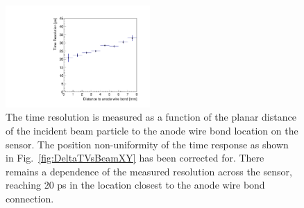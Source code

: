 \begin{figure}[htbp]
\centering 
\includegraphics[width=0.49\textwidth]{figures/TimeResolutionVsR.pdf} 
\caption{ The time resolution is measured as a function of the planar distance of the 
incident beam particle to the anode wire bond location on the sensor. The position non-uniformity
of the time response as shown in Fig.~\ref{fig:DeltaTVsBeamXY} has been corrected for. There 
remains a dependence of the measured resolution across the sensor, reaching 20 ps in the location
closest to the anode wire bond connection.}
\label{fig:TimeResolutionVsR}
\end{figure}




